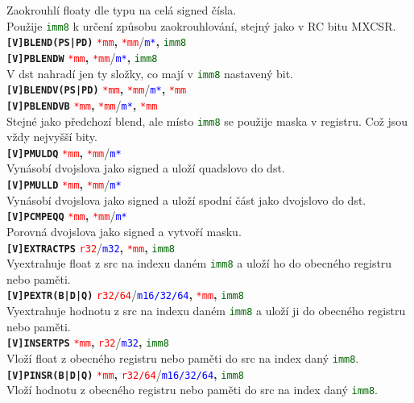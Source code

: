 \documentclass[
]{cz_sablona}
\newcommand{\reg}[1]{\texttt{\textcolor{red}{#1}}}
\newcommand{\mem}[1]{\texttt{\textcolor{blue}{#1}}}
\newcommand{\const}[1]{\texttt{\textcolor{darkgreen}{#1}}}
\newcommand{\instr}[1]{\texttt{\textbf{#1}}}
\begin{document}
Zaokrouhlí floaty dle typu na celá signed čísla.\\
Použije \const{imm8} k určení způsobu zaokrouhlování,
stejný jako v RC bitu MXCSR.
\instr{[V]BLEND(PS|PD)} \reg{*mm}\textbf{,} \reg{*mm}/\mem{m*}\textbf{,} \const{imm8}\\
\instr{[V]PBLENDW} \reg{*mm}\textbf{,} \reg{*mm}/\mem{m*}\textbf{,} \const{imm8}\\
V dst nahradí jen ty složky, co mají v \const{imm8} nastavený bit.\\
\instr{[V]BLENDV(PS|PD)} \reg{*mm}\textbf{,} \reg{*mm}/\mem{m*}\textbf{,} \reg{*mm}\\
\instr{[V]PBLENDVB} \reg{*mm}\textbf{,} \reg{*mm}/\mem{m*}\textbf{,} \reg{*mm}\\
Stejné jako předchozí blend, ale místo \const{imm8} se použije maska v registru.
Což jsou vždy nejvyšší bity.
\\[0.5em]
\instr{[V]PMULDQ} \reg{*mm}\textbf{,} \reg{*mm}/\mem{m*}\\
Vynásobí dvojslova jako signed a uloží quadslovo do dst.
\\[0.5em]
\instr{[V]PMULLD} \reg{*mm}\textbf{,} \reg{*mm}/\mem{m*}\\
Vynásobí dvojslova jako signed a uloží spodní část jako dvojslovo do dst.\\
\instr{[V]PCMPEQQ} \reg{*mm}\textbf{,} \reg{*mm}/\mem{m*}\\
Porovná dvojslova jako signed a vytvoří masku.
\\[0.5em]
\instr{[V]EXTRACTPS} \reg{r32}/\mem{m32}\textbf{,} \reg{*mm}\textbf{,} \const{imm8}\\
Vyextrahuje float z src na indexu daném \const{imm8}
a uloží ho do obecného registru nebo paměti.\\
\instr{[V]PEXTR(B|D|Q)} \reg{r32/64}/\mem{m16/32/64}\textbf{,} \reg{*mm}\textbf{,} \const{imm8}\\
Vyextrahuje hodnotu z src na indexu daném \const{imm8}
a uloží ji do obecného registru nebo paměti.\\
\instr{[V]INSERTPS} \reg{*mm}\textbf{,} \reg{r32}/\mem{m32}\textbf{,} \const{imm8}\\
Vloží float z obecného registru nebo paměti do src na index daný \const{imm8}.\\
\instr{[V]PINSR(B|D|Q)} \reg{*mm}\textbf{,} \reg{r32/64}/\mem{m16/32/64}\textbf{,} \const{imm8}\\
Vloží hodnotu z obecného registru nebo paměti do src na index daný \const{imm8}.
\\[0.5em]
\end{document}
